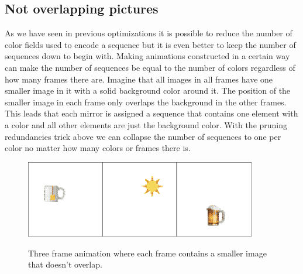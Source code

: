 \documentclass{article}
\begin{document}
\subsection{Not overlapping pictures}

As we have seen in previous optimizations it is possible to reduce the
number of color fields used to encode a sequence but it is even better
to keep the number of sequences down to begin with. Making animations constructed
in a certain way can make the number of sequences be equal to the number
of colors regardless of how many frames there are. Imagine that all
images in all frames have one smaller image in it with a solid
background color around it. The position of the smaller image in each
frame only overlaps the background in the other frames. This leads that
each mirror is assigned a sequence that contains one element with a
color and all other elements are just the background color. With the
pruning redundancies trick above we can collapse the number of sequences
to one per color no matter how many colors or frames there is.

\begin{figure}[ht!]
\includegraphics[width=0.3\textwidth]{images/tea-sun-lager-0.png}\includegraphics[width=0.3\textwidth]{images/tea-sun-lager-1.png}\includegraphics[width=0.3\textwidth]{images/tea-sun-lager-2.png}
\caption{Three frame animation where each frame contains a smaller image that doesn't overlap.}
\end{figure}
\end{document}
